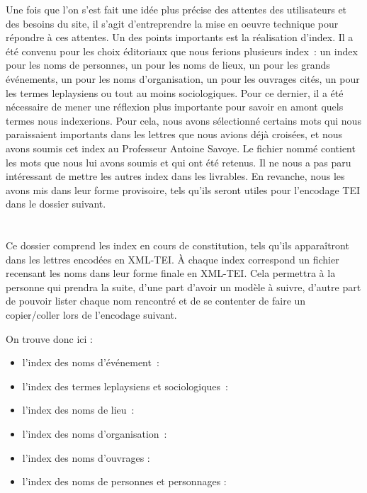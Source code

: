 Une fois que l'on s'est fait une idée plus précise des attentes des utilisateurs et des besoins du site, il s'agit d'entreprendre la mise en oeuvre technique pour répondre à ces attentes.
Un des points importants est la réalisation d'index.
Il a été convenu pour les choix éditoriaux que nous ferions plusieurs index~: un index pour les noms de personnes, un pour les noms de lieux, un pour les grands événements, un pour les noms d'organisation, un pour les ouvrages cités, un pour les termes leplaysiens ou tout au moins sociologiques.
Pour ce dernier, il a été nécessaire de mener une réflexion plus importante pour savoir en amont quels termes nous indexerions. Pour cela, nous avons sélectionné certains mots qui nous paraissaient importants dans les lettres que nous avions déjà croisées, et nous avons soumis cet index au Professeur Antoine Savoye.
Le fichier nommé  contient les mots que nous lui avons soumis et qui ont été retenus. 
Il ne nous a pas paru intéressant de mettre les autres index dans les livrables.
En revanche, nous les avons mis dans leur forme provisoire, tels qu'ils seront utiles pour l'encodage TEI dans le dossier suivant.


\section{}

Ce dossier comprend les index en cours de constitution, tels qu'ils apparaîtront dans les lettres encodées en XML-TEI.
À chaque index correspond un fichier recensant les noms dans leur forme finale en XML-TEI. Cela permettra à la personne qui prendra la suite, d'une part d'avoir un modèle à suivre, d'autre part de pouvoir lister chaque nom rencontré et de se contenter de faire un copier/coller lors de l'encodage suivant.

On trouve donc ici :
\begin{itemize}
    \item l'index des noms d'événement~: 
    \item l'index des termes leplaysiens et sociologiques~: 
    \item l'index des noms de lieu~: 
    \item l'index des noms d'organisation~:  
    \item l'index des noms d'ouvrages : 
    \item l'index des noms de personnes et personnages :  
\end{itemize}

